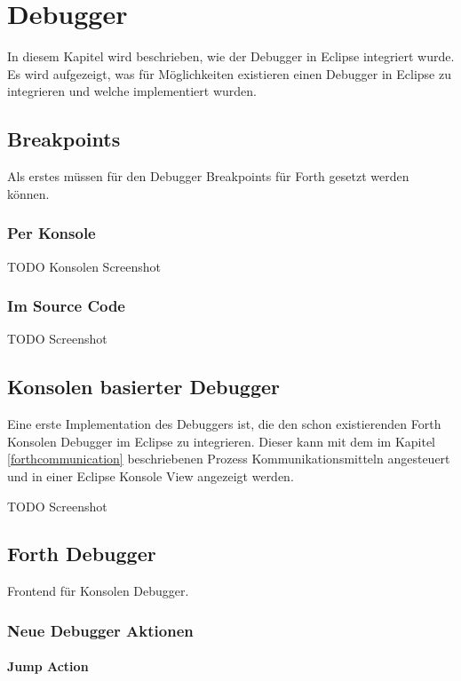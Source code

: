 \chapter{Debugger}

In diesem Kapitel wird beschrieben, wie der Debugger in Eclipse integriert wurde. Es wird aufgezeigt, was für Möglichkeiten existieren einen Debugger in Eclipse zu integrieren und welche implementiert wurden.

\section{Breakpoints}
Als erstes müssen für den Debugger Breakpoints für Forth gesetzt werden können.

\subsection{Per Konsole}

TODO Konsolen Screenshot

\subsection{Im Source Code}

TODO Screenshot

\section{Konsolen basierter Debugger}

Eine erste Implementation des Debuggers ist, die den schon existierenden Forth Konsolen Debugger im Eclipse zu integrieren. Dieser kann mit dem im Kapitel \ref{forthcommunication} beschriebenen Prozess Kommunikationsmitteln angesteuert und in einer Eclipse Konsole View angezeigt werden.

TODO Screenshot

\section{Forth Debugger}

Frontend für Konsolen Debugger.

\subsection{Neue Debugger Aktionen}

\subsubsection{Jump Action}

